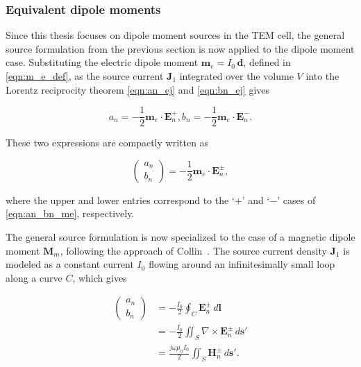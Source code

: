 \subsubsection{Equivalent dipole moments}\label{sec:equ-dip-mom}

Since this thesis focuses on dipole moment sources in the TEM cell, the general source formulation from the previous section is now applied to the dipole moment case. Substituting the electric dipole moment $\mathbf{m}_e = I_0 \,\mathbf{d}$, defined in \eqref{eqn:m_e_def}, as the source current $\mathbf{J}_1$ integrated over the volume $V$ into the Lorentz reciprocity theorem \eqref{eqn:an_ej} and \eqref{eqn:bn_ej} gives~\cite{Sreenivasiah_Chang_Ma_1981}

\begin{subequations}\label{eqn:an_bn_me}
	\begin{equation}
		a_n = -\frac{1}{2}\mathbf{m}_e\cdot\mathbf{E}_n^+,
		\label{eqn:an_me}
	\end{equation}
	\begin{equation}
		b_n = -\frac{1}{2}\mathbf{m}_e\cdot\mathbf{E}_n^-.
		\label{eqn:bn_me}
	\end{equation}
\end{subequations}

These two expressions are compactly written as

\begin{equation}
	\begin{pmatrix}a_n \\ b_n\end{pmatrix} = -\frac{1}{2}\mathbf{m}_e\cdot\mathbf{E}_n^\pm,
	\label{eqn:dipole_tem_waves}
\end{equation}

where the upper and lower entries correspond to the `$+$' and `$-$' cases 
of \eqref{eqn:an_bn_me}, respectively.

The general source formulation is now specialized to the case of a magnetic dipole 
moment $\mathbf{M}_m$, following the approach of Collin~\cite[p.~361]{Collin_2015}. 
The source current density $\mathbf{J}_1$ is modeled as a constant current $I_0$ flowing 
around an infinitesimally small loop along a curve $C$, which gives

\begin{align}
	\begin{pmatrix}a_n \\ b_n\end{pmatrix} 
	&= -\frac{I_0}{2}\oint_C \mathbf{E}_n^\pm \,d\mathbf{l} \nonumber \\
	&= -\frac{I_0}{2}\iint_{S} \nabla \times \mathbf{E}_n^\pm 
	\,d\mathbf{s}' \nonumber\\
	&= \frac{j\omega\mu_0 I_0}{2}\iint_{S} \mathbf{H}_n^\pm 
	\,d\mathbf{s}'.
	\label{eqn:mag_dipole_moment_tem}
\end{align}

